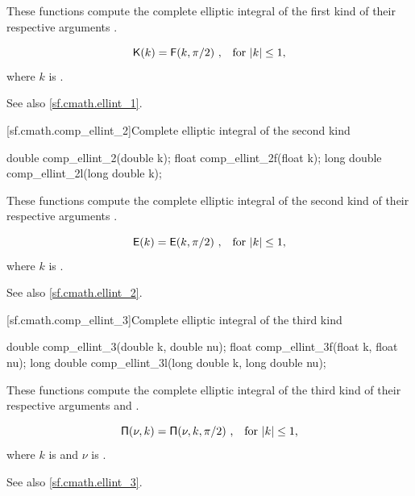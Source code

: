 \begin{itemdescr}
\pnum
\effects
These functions compute
the complete elliptic integral of the first kind
of their respective arguments
.

\pnum
\returns
\[ \mathsf{K}(k) = \mathsf{F}(k, \pi / 2) \text{ ,\quad for $|k| \le 1$,} \]
where
$k$ is .

\pnum
See also \ref{sf.cmath.ellint_1}.
\end{itemdescr}

[sf.cmath.comp_ellint_2]{Complete elliptic integral of the second kind}%
%
%
%
%
%
\begin{itemdecl}
double       comp_ellint_2(double k);
float        comp_ellint_2f(float k);
long double  comp_ellint_2l(long double k);
\end{itemdecl}

\begin{itemdescr}
\pnum
\effects
These functions compute
the complete elliptic integral of the second kind
of their respective arguments
.

\pnum
\returns
\[ \mathsf{E}(k) = \mathsf{E}(k, \pi / 2) \text{ ,\quad for $|k| \le 1$,} \]
where
$k$ is .

\pnum
See also \ref{sf.cmath.ellint_2}.
\end{itemdescr}

[sf.cmath.comp_ellint_3]{Complete elliptic integral of the third kind}%
%
%
%
%
%
\begin{itemdecl}
double       comp_ellint_3(double k, double nu);
float        comp_ellint_3f(float k, float nu);
long double  comp_ellint_3l(long double k, long double nu);
\end{itemdecl}

\begin{itemdescr}
\pnum
\effects
These functions compute
the complete elliptic integral of the third kind
of their respective arguments
 and .

\pnum
\returns
\[ \mathsf{\Pi}(\nu, k) = \mathsf{\Pi}(\nu, k, \pi / 2) \text{ ,\quad for $|k| \le 1$,} \]
where
$k$ is  and
$\nu$ is .

\pnum
See also \ref{sf.cmath.ellint_3}.
\end{itemdescr}

